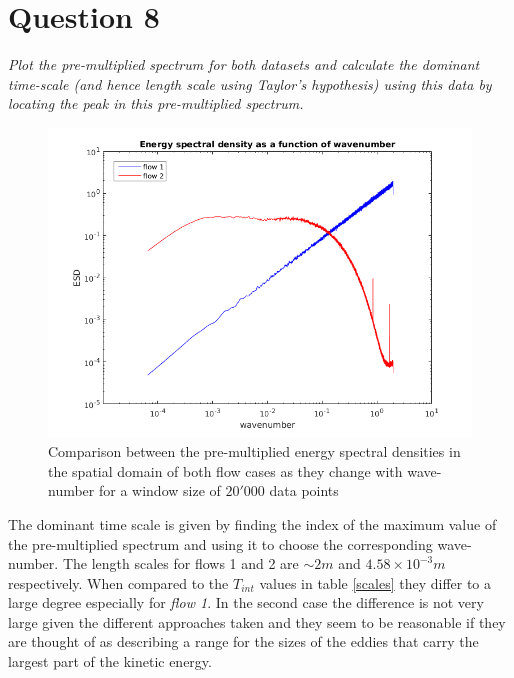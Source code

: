\section*{Question 8}
\textit{Plot the pre-multiplied spectrum for both datasets and calculate the dominant time-scale (and hence length scale using Taylor’s hypothesis) using this data by locating the peak in this pre-multiplied spectrum.}

\begin{figure}[!ht]
\centering
\includegraphics[scale=0.8]{./TEXT/esd-n.png}
\caption{Comparison between the pre-multiplied energy spectral densities in the spatial domain of both flow cases as they change with wave-number for a window size of $20'000$ data points}
\label{esd-n}
\end{figure}

The dominant time scale is given by finding the index of the maximum value of the pre-multiplied spectrum and using it to choose the corresponding wave-number. The length scales for flows 1 and 2 are $\sim 2 m$ and $4.58 \times 10^{-3} m$ respectively. When compared to the $T_{int}$ values in table \ref{scales} they differ to a large degree especially for \emph{flow 1}. In the second case the difference is not very large given the different approaches taken and they seem to be reasonable if they are thought of as describing a range for the sizes of the eddies that carry the largest part of the kinetic energy.